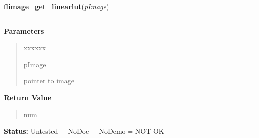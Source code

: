 \hspace{.8\funcindent}\begin{boxedminipage}{\funcwidth}

    \raggedright \textbf{flimage\_get\_linearlut}(\textit{pImage})

    \vspace{-1.5ex}

    \rule{\textwidth}{0.5\fboxrule}
\setlength{\parskip}{2ex}
\setlength{\parskip}{1ex}
      \textbf{Parameters}
      \vspace{-1ex}

      \begin{quote}
        \begin{Ventry}{xxxxxx}

          \item[pImage]

          pointer to image

        \end{Ventry}

      \end{quote}

      \textbf{Return Value}
    \vspace{-1ex}

      \begin{quote}
      num

      \end{quote}

\textbf{Status:} Untested + NoDoc + NoDemo = NOT OK



    \end{boxedminipage}

    \label{xformslib:library:flimage_invalidate_pixels}

    \vspace{0.5ex}

